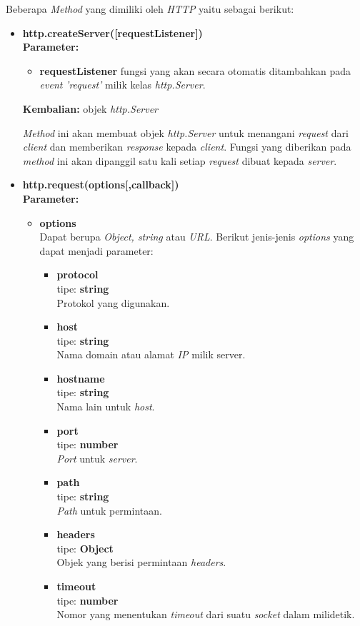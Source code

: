 Beberapa \textit{Method} yang dimiliki oleh \textit{HTTP} yaitu sebagai berikut:
\begin{itemize}
	\item \textbf{http.createServer([requestListener])} \\ \textbf{Parameter:}
	\begin{itemize}
		\item \textbf{requestListener} fungsi yang akan secara otomatis ditambahkan pada \textit{event} \textit{'request'} milik kelas \textit{http.Server}.
	\end{itemize}
	\textbf{Kembalian:} objek \textit{http.Server}
	
	\textit{Method} ini akan membuat objek \textit{http.Server} untuk menangani \textit{request} dari \textit{client} dan memberikan \textit{response} kepada \textit{client}. Fungsi yang diberikan pada \textit{method} ini akan dipanggil satu kali setiap \textit{request} dibuat kepada \textit{server}.
	
	\item \textbf{http.request(options[,callback])} \\ 
	\textbf{Parameter:}
	\begin{itemize}
		\item \textbf{options} \\ Dapat berupa \textit{Object, string} atau \textit{URL}. Berikut jenis-jenis \textit{options} yang dapat menjadi parameter:
		\begin{itemize}
			\item \textbf{protocol} \\tipe: \textbf{string} \\ Protokol yang digunakan.
			\item \textbf{host} \\tipe: \textbf{string} \\ Nama domain atau alamat \textit{IP} milik server.
			\item \textbf{hostname} \\tipe: \textbf{string} \\ Nama lain untuk \textit{host}.
			\item \textbf{port} \\tipe: \textbf{number} \\ \textit{Port} untuk \textit{server}.
			\item \textbf{path} \\tipe: \textbf{string} \\ \textit{Path} untuk permintaan.
			\item \textbf{headers} \\tipe: \textbf{Object} \\ Objek yang berisi permintaan \textit{headers}.
			\item \textbf{timeout} \\tipe: \textbf{number} \\ Nomor yang menentukan \textit{timeout} dari suatu \textit{socket} dalam milidetik.
		\end{itemize}
	

\end{itemize}
\end{itemize}
